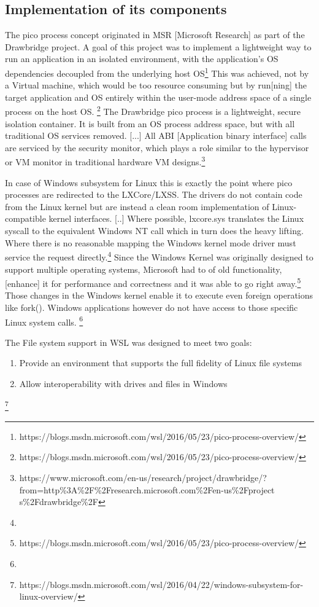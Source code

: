 \documentclass[utf8,biblatex]{lni}
\begin{document}
\subsection{Implementation of its components}

\glqq The pico process concept originated in MSR [Microsoft Research] as part of the Drawbridge project. A goal of this project was to implement a lightweight way to run an application in an isolated environment, with the application’s OS dependencies decoupled from the underlying host OS\glqq \footnote{https://blogs.msdn.microsoft.com/wsl/2016/05/23/pico-process-overview/} This was achieved, not by a Virtual machine, which would be too resource consuming but by \glqq run[ning] the target application and OS entirely within the user-mode address space of a single process on the host OS. \glqq \footnote{https://blogs.msdn.microsoft.com/wsl/2016/05/23/pico-process-overview/} \glqq The Drawbridge pico process is a lightweight, secure isolation container. It is built from an OS process address space, but with all traditional OS services removed. [...] All ABI [Application binary interface] calls are serviced by the security monitor, which plays a role similar to the hypervisor or VM monitor in traditional hardware VM designs.\glqq \footnote{https://www.microsoft.com/en-us/research/project/drawbridge/?from=http\%3A\%2F\%2Fresearch.microsoft.com\%2Fen-us\%2Fproject s\%2Fdrawbridge\%2F}

In case of Windows subsystem for Linux this is exactly the point where pico processes are redirected to the LXCore/LXSS. \glqq The drivers do not contain code from the Linux kernel but are instead a clean room implementation of Linux-compatible kernel interfaces. [..] Where possible, lxcore.sys translates the Linux syscall to the equivalent Windows NT call which in turn does the heavy lifting. Where there is no reasonable mapping the Windows kernel mode driver must service the request directly.\glqq \footnote{} Since the Windows Kernel was originally designed to support multiple operating systems, Microsoft had to \glqq [dust] [...] of old functionality, [enhance] it for performance and correctness and it was able to go right away.\glqq \footnote{https://blogs.msdn.microsoft.com/wsl/2016/05/23/pico-process-overview/} Those changes in the Windows kernel enable it to execute even foreign operations like fork(). Windows applications however do not have access to those specific Linux system calls. \footnote{}

\glqq The File system support in WSL was designed to meet two goals:
\begin{enumerate}
    \item Provide an environment that supports the full fidelity of Linux file systems
    \item Allow interoperability with drives and files in Windows
\end{enumerate}\footnote{https://blogs.msdn.microsoft.com/wsl/2016/04/22/windows-subsystem-for-linux-overview/}
\end{document}
